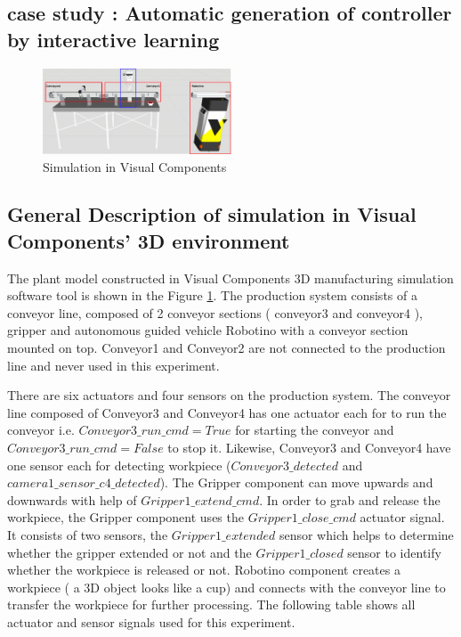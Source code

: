 \begin{bibunit}
\section{case study : Automatic generation of controller by interactive learning}
\label{sec:casestudy}

\begin{figure}[!t]
	\centering
	\includegraphics[width=0.5\textwidth]{MX_Papers/Paper6/images/simulation.png}
	\caption{Simulation in Visual Components}
	\label{SIM_UI}
\end{figure}

\subsection{General Description of simulation in Visual Components' 3D environment}

The plant model constructed in Visual Components 3D manufacturing simulation software tool is shown in the Figure \ref{SIM_UI}.	The production system consists of a conveyor line, composed of 2 conveyor sections ( conveyor3 and conveyor4 ), gripper and autonomous guided vehicle Robotino with a conveyor section mounted on top.  Conveyor1 and Conveyor2 are not connected to the production line and never used in this experiment.

There are six actuators and four sensors on the production system. The conveyor line composed of Conveyor3 and  Conveyor4  has  one actuator each for  to run the conveyor i.e. $Conveyor3\_run\_cmd = True$ for starting the conveyor  and $Conveyor3\_run\_cmd = False$ to stop it. Likewise,  Conveyor3 and  Conveyor4  have  one sensor each for  detecting workpiece ($ Conveyor3\_detected$ and $camera1\_sensor\_c4\_detected$). The Gripper component can move upwards and downwards with help of $Gripper1\_extend\_cmd$. In order to grab and release  the workpiece, the Gripper component uses the $Gripper1\_close\_cmd$ actuator signal. It consists of two sensors, the $Gripper1\_extended$ sensor  which helps to determine whether the gripper extended or not and the $Gripper1\_closed$ sensor to identify whether the workpiece is released or not. Robotino component creates a workpiece ( a 3D object looks like a cup) and connects with the conveyor line to transfer the workpiece for further processing. The following table shows all actuator and sensor signals used for this experiment.


\end{bibunit}

